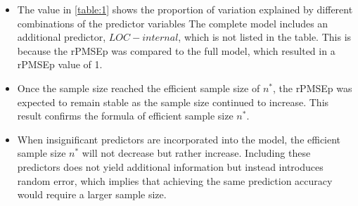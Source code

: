 \documentclass[11pt]{article}
\begin{document}
\begin{table}[h!]
\centering
{}
\caption{Efficient sample size $n^*$}
\label{table:2}
\end{table}

\begin{itemize}

\item The value in \ref{table:1} shows the proportion of variation explained by different combinations of the predictor variables
The complete model includes an additional predictor, $LOC-internal$, which is not listed in the table. This is because the rPMSEp was compared to the full model, which resulted in a rPMSEp value of 1.

\item Once the sample size reached the efficient sample size of $n^*$, the rPMSEp was expected to remain stable as the sample size continued to increase. This result confirms the formula of efficient sample size $n^*$.

\item When insignificant predictors are incorporated into the model, the efficient sample size $n^*$ will not decrease but rather increase. Including these predictors does not yield additional information but instead introduces random error, which implies that achieving the same prediction accuracy would require a larger sample size.

\
\end{itemize}




\end{document}

